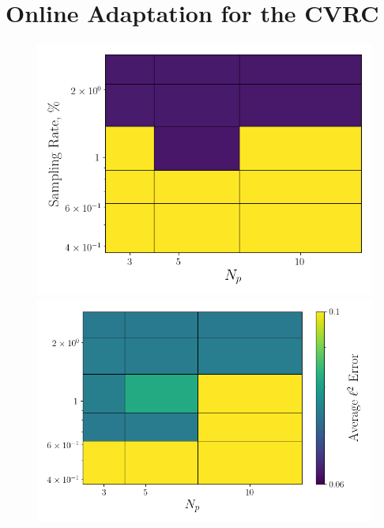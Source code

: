 \section{Online Adaptation for the CVRC}

\begin{figure}
	\begin{minipage}{0.46\linewidth}
		\includegraphics[width=0.99\linewidth]{Chapters/AdaptiveResults/Images/cvrc/errContours/err_contour_iter2.png}
	\end{minipage}
	\begin{minipage}{0.53\linewidth}
		\includegraphics[width=0.99\linewidth]{Chapters/AdaptiveResults/Images/cvrc/errContours/err_contour_iter3.png}
	\end{minipage}


\end{figure}
